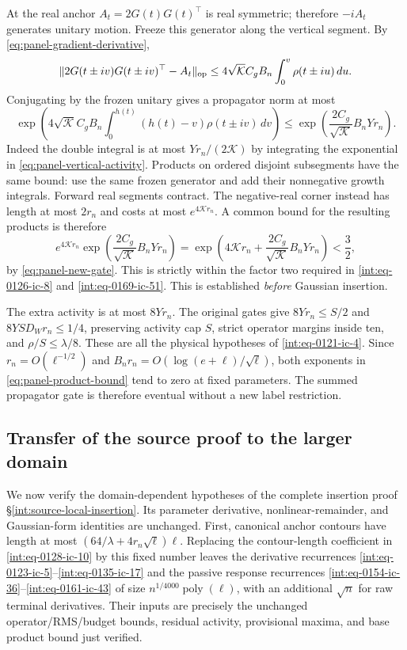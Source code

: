 At the real anchor \(A_t=2G(t)G(t)^\top\) is real symmetric;
therefore \(-iA_t\) generates unitary motion.  Freeze this generator
along the vertical segment.  By \eqref{eq:panel-gradient-derivative},
\[
 \|2G(t\pm iv)G(t\pm iv)^\top-A_t\|_{\rm op}
 \le4\sqrt{\mathcal K}C_gB_n\int_0^v\rho(t\pm iu)\,du.
\]
Conjugating by the frozen unitary gives a propagator norm at most
\begin{equation}
 \exp\left(4\sqrt{\mathcal K}C_gB_n
      \int_0^{h(t)}(h(t)-v)\rho(t\pm iv)\,dv\right)
 \le\exp\left(\frac{2C_g}{\sqrt{\mathcal K}}B_nYr_n\right).
 \label{eq:panel-unitary-bound}
\end{equation}
Indeed the double integral is at most \(Yr_n/(2\mathcal K)\)
by integrating the exponential in \eqref{eq:panel-vertical-activity}.
Products on ordered disjoint subsegments have the same bound: use the
same frozen generator and add their nonnegative growth integrals.
Forward real segments contract.  The negative-real corner instead has
length at most \(2r_n\) and costs at most \(e^{4\mathcal K r_n}\).
A common bound for the resulting products is therefore
\begin{equation}
 e^{4\mathcal K r_n}
 \exp\left(\frac{2C_g}{\sqrt{\mathcal K}}B_nYr_n\right)
 =\exp\left(4\mathcal K r_n+
              \frac{2C_g}{\sqrt{\mathcal K}}B_nYr_n\right)<\frac32,
 \label{eq:panel-product-bound}
\end{equation}
by \eqref{eq:panel-new-gate}.  This is strictly within the factor two required in
\eqref{int:eq-0126-ic-8} and \eqref{int:eq-0169-ic-51}.
This is established \emph{before} Gaussian insertion.

The extra activity is at most \(8Yr_n\).  The original gates give
\(8Yr_n\le S/2\) and \(8YSD_Wr_n\le1/4\), preserving activity
cap \(S\), strict operator margins inside ten, and
\(\rho/S\le\lambda/8\).  These are all the physical hypotheses
of \eqref{int:eq-0121-ic-4}.  Since
\(r_n=O(\ell^{-1/2})\) and
\(B_nr_n=O(\log(e+\ell)/\sqrt\ell)\), both exponents in
\eqref{eq:panel-product-bound} tend to zero at fixed parameters.
The summed propagator gate is therefore eventual without a new label
restriction.

\subsection{Transfer of the source proof to the larger domain}
\label{sec:panel-source-transfer}

We now verify the domain-dependent hypotheses of the complete insertion
proof \S\ref{int:source-local-insertion}.  Its parameter derivative,
nonlinear-remainder, and Gaussian-form identities are unchanged.
First, canonical anchor contours have length at most
\((64/\lambda+4r_n\sqrt\ell)\ell\).  Replacing the contour-length
coefficient in \eqref{int:eq-0128-ic-10} by this fixed number leaves
the derivative recurrences \eqref{int:eq-0123-ic-5}--\eqref{int:eq-0135-ic-17}
and the passive response recurrences
\eqref{int:eq-0154-ic-36}--\eqref{int:eq-0161-ic-43} of size
\(n^{1/4000}\operatorname{poly}(\ell)\), with an additional
\(\sqrt n\) for raw terminal derivatives.  Their inputs are precisely
the unchanged operator/RMS/budget bounds, residual activity, provisional
maxima, and base product bound just verified.

